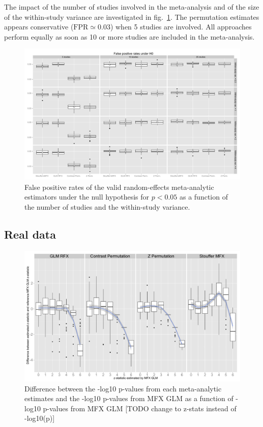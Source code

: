 \documentclass{llncs}
\begin{document}
The impact of the number of studies involved in the meta-analysis and of the size of the within-study variance are investigated in fig.~\ref{fig_fpr_valid}. The permutation estimates appears conservative ($\text{FPR}\simeq 0.03$) when 5 studies are involved. All approaches perform equally as soon as 10 or more studies are included in the meta-analysis. 
\begin{figure}[ht]
	\centering
	\includegraphics[width=\linewidth]{./Rplot_valids.pdf}
	\caption{False positive rates of the valid random-effects meta-analytic estimators under the null hypothesis for $p<0.05$ as a function of the number of studies and the within-study variance.}
	\label{fig_fpr_valid}
\end{figure}


\subsection{Real data}

\begin{figure}[ht]
	\centering
	\includegraphics[width=\linewidth]{./Rplot_realdata.pdf}
	\caption{Difference between the -log10 p-values from each meta-analytic estimates and the -log10 p-values from MFX GLM as a function of -log10 p-values from MFX GLM [TODO change to z-stats instead of -log10(p)]}
	\label{fig_realdata}
\end{figure}
\end{document}
